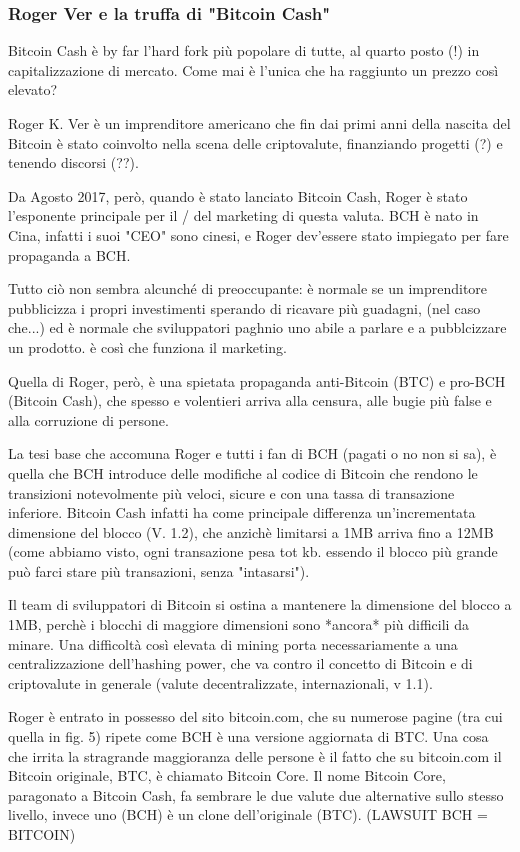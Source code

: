 \documentclass {article}
\begin{document}
\subsubsection {Roger Ver e la truffa di "Bitcoin Cash"}



Bitcoin Cash è by far l'hard fork più popolare di tutte, al quarto posto (!) in capitalizzazione di mercato. Come mai è l'unica che ha raggiunto un prezzo così elevato?

Roger K. Ver è un imprenditore americano che fin dai primi anni della nascita del Bitcoin è stato coinvolto nella scena delle criptovalute, finanziando progetti (?) e tenendo discorsi (??).

Da Agosto 2017, però, quando è stato lanciato Bitcoin Cash, Roger è stato l'esponente principale per il / del marketing di questa valuta. BCH è nato in Cina, infatti i suoi "CEO" sono cinesi, e Roger dev'essere stato impiegato per fare propaganda a BCH.

Tutto ciò non sembra alcunché di preoccupante: è normale se un imprenditore pubblicizza i propri investimenti sperando di ricavare più guadagni, (nel caso che...) ed è normale che sviluppatori paghnio uno abile a parlare e a pubblcizzare un prodotto. è così che funziona il marketing.

Quella di Roger, però, è una spietata propaganda anti-Bitcoin (BTC) e pro-BCH (Bitcoin Cash), che spesso e volentieri arriva alla censura, alle bugie più false e alla corruzione di persone.

La tesi base che accomuna Roger e tutti i fan di BCH (pagati o no non si sa), è quella che BCH introduce delle modifiche al codice di Bitcoin che rendono le transizioni notevolmente più veloci, sicure e con una tassa di transazione inferiore. Bitcoin Cash infatti ha come principale differenza un'incrementata dimensione del blocco (V. 1.2), che anzichè limitarsi a 1MB arriva fino a 12MB (come abbiamo visto, ogni transazione pesa tot kb. essendo il blocco più grande può farci stare più transazioni, senza "intasarsi").

Il team di sviluppatori di Bitcoin si ostina a mantenere la dimensione del blocco a 1MB, perchè i blocchi di maggiore dimensioni sono *ancora* più difficili da minare. Una difficoltà così elevata di mining porta necessariamente a una centralizzazione dell'hashing power, che va contro il concetto di Bitcoin e di criptovalute in generale (valute decentralizzate, internazionali, v 1.1).

Roger è entrato in possesso del sito bitcoin.com, che su numerose pagine (tra cui quella in fig. 5) ripete come BCH è una versione aggiornata di BTC. Una cosa che irrita la stragrande maggioranza delle persone è il fatto che su bitcoin.com il Bitcoin originale, BTC, è chiamato Bitcoin Core. Il nome Bitcoin Core, paragonato a Bitcoin Cash, fa sembrare le due valute due alternative sullo stesso livello, invece uno (BCH) è un clone dell'originale (BTC). (LAWSUIT BCH = BITCOIN)
\end{document}
